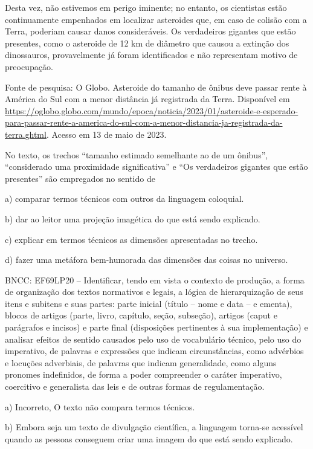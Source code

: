 {Desta vez, não estivemos em perigo iminente; no entanto, os cientistas
estão continuamente empenhados em localizar asteroides que, em caso de
colisão com a Terra, poderiam causar danos consideráveis. Os verdadeiros
gigantes que estão presentes, como o asteroide de 12 km de diâmetro que
causou a extinção dos dinossauros, provavelmente já foram identificados
e não representam motivo de preocupação.

Fonte de pesquisa: O Globo. Asteroide do tamanho de ônibus deve passar
rente à América do Sul com a menor distância já registrada da Terra.
Disponível em
\url{https://oglobo.globo.com/mundo/epoca/noticia/2023/01/asteroide-e-esperado-para-passar-rente-a-america-do-sul-com-a-menor-distancia-ja-registrada-da-terra.ghtml}.
Acesso em 13 de maio de 2023.

No texto, os trechos ``tamanho estimado semelhante ao de um ônibus'',
``considerado uma proximidade significativa'' e ``Os verdadeiros
gigantes que estão presentes'' são empregados no sentido de

a) comparar termos técnicos com outros da linguagem coloquial.

b) dar ao leitor uma projeção imagética do que está sendo explicado.

c) explicar em termos técnicos as dimensões apresentadas no trecho.

d) fazer uma metáfora bem-humorada das dimensões das coisas no universo.

BNCC: EF69LP20 -- Identificar, tendo em vista o contexto de produção, a
forma de organização dos textos normativos e legais, a lógica de
hierarquização de seus itens e subitens e suas partes: parte inicial
(título -- nome e data -- e ementa), blocos de artigos (parte, livro,
capítulo, seção, subseção), artigos (caput e parágrafos e incisos) e
parte final (disposições pertinentes à sua implementação) e analisar
efeitos de sentido causados pelo uso de vocabulário técnico, pelo uso do
imperativo, de palavras e expressões que indicam circunstâncias, como
advérbios e locuções adverbiais, de palavras que indicam generalidade,
como alguns pronomes indefinidos, de forma a poder compreender o caráter
imperativo, coercitivo e generalista das leis e de outras formas de
regulamentação.

a) Incorreto, O texto não compara termos técnicos.

b) Embora seja um texto de divulgação científica, a linguagem torna-se
acessível quando as pessoas conseguem criar uma imagem do que está sendo
explicado.

}

